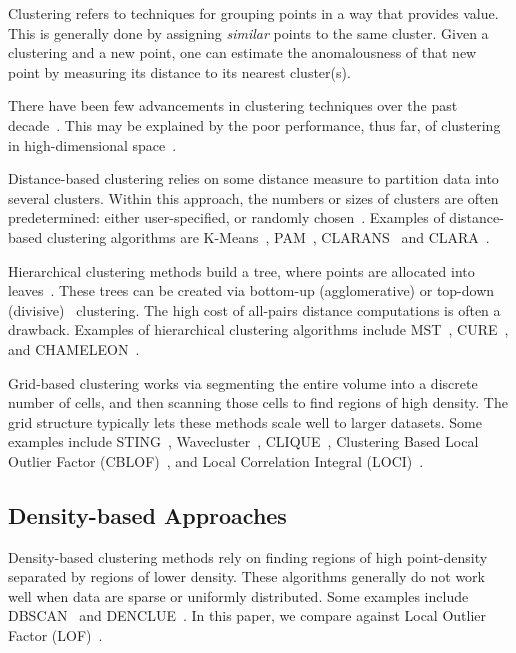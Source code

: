 Clustering refers to techniques for grouping points in a way that provides value.
This is generally done by assigning \textit{similar} points to the same cluster.
Given a clustering and a new point, one can estimate the anomalousness of that new point by measuring its distance to its nearest cluster(s).

There have been few advancements in clustering techniques over the past decade~\cite{wang2019progress}.
This may be explained by the poor performance, thus far, of clustering in high-dimensional space~\cite{zhang2013advancements}.

Distance-based clustering relies on some distance measure to partition data into several clusters.
Within this approach, the numbers or sizes of clusters are often predetermined: either user-specified, or randomly chosen~\cite{wang2019progress}.
Examples of distance-based clustering algorithms are
K-Means~\cite{macqueen1967some},
PAM~\cite{kaufman2009finding},
CLARANS~\cite{ng1994efficient} and
CLARA~\cite{kaufman2009finding}.

Hierarchical clustering methods build a tree, where points are allocated into leaves~\cite{wang2019progress}.
These trees can be created via bottom-up (agglomerative) or top-down (divisive)~\cite{agrawal1998automatic} clustering.
The high cost of all-pairs distance computations is often a drawback.
Examples of hierarchical clustering algorithms include
MST~\cite{zahn1971graph},
CURE~\cite{guha1998cure}, and
CHAMELEON~\cite{karypis1999hierarchical}.

Grid-based clustering works via segmenting the entire volume into a discrete number of cells, and then scanning those cells to find regions of high density.
The grid structure typically lets these methods scale well to larger datasets.
Some examples include
STING~\cite{wang1997sting},
Wavecluster~\cite{sheikholeslami2000wavecluster},
CLIQUE~\cite{agrawal1998automatic},
Clustering Based Local Outlier Factor (CBLOF)~\cite{he2003cblof}, and
Local Correlation Integral (LOCI)~\cite{papadimitriou2003loci}.

\subsection{Density-based Approaches}
\label{subsec:introduction:density-based-approaches}

Density-based clustering methods rely on finding regions of high point-density separated by regions of lower density.
These algorithms generally do not work well when data are sparse or uniformly distributed.
Some examples include
DBSCAN~\cite{ester1996density} and
DENCLUE~\cite{hinneburg1998efficient}.
In this paper, we compare against Local Outlier Factor (LOF)~\cite{breunig2000lof}.


